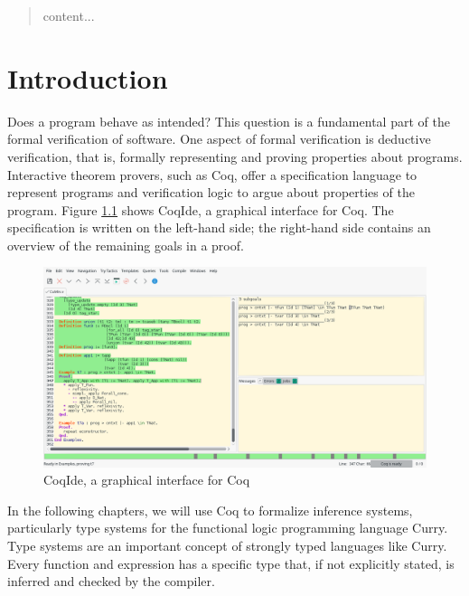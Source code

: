 \documentclass[paper = a4, fleqn, abstract=on, twoside]{scrreprt}
\begin{document}
\begin{abstract}
	content...
\end{abstract}

\renewcommand{\contentsname}{Contents}
\tableofcontents   %
\listoffigures     %

\newpage               %


%   
%   

\chapter{Introduction}
Does a program behave as intended? This question is a fundamental part of the formal verification of software. One aspect of formal verification is deductive verification, that is, formally representing and proving properties about programs.\citep{filliatre2011deductive} Interactive theorem provers, such as Coq, offer a specification language to represent programs and verification logic to argue about properties of the program. Figure \ref{coqscreen} shows CoqIde, a graphical interface for Coq. The specification is written on the left-hand side; the right-hand side contains an overview of the remaining goals in a proof.
\begin{figure}[H]
\includegraphics[width=\linewidth]{images/coq.png}
\caption{CoqIde, a graphical interface for Coq}
\label{coqscreen}
\end{figure}\noindent 
In the following chapters, we will use Coq to formalize inference systems, particularly type systems for the functional logic programming language Curry. Type systems are an important concept of strongly typed languages like Curry. Every function and expression has a specific type that, if not explicitly stated, is inferred and checked by the compiler.
\end{document}
